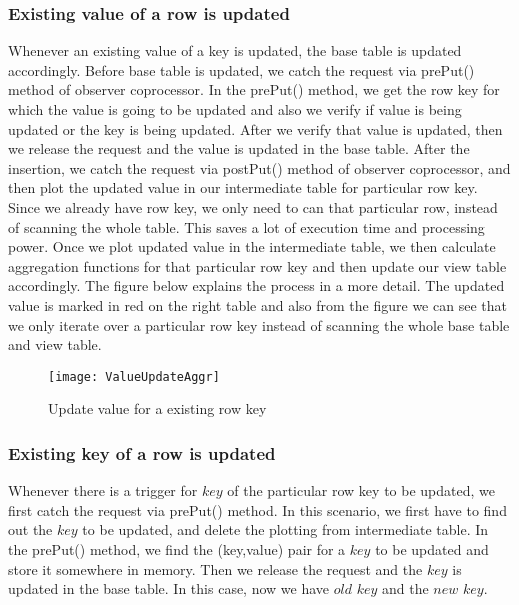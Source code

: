\documentclass[11pt,a4paper,bibtotoc,idxtotoc,headsepline,footsepline,footexclude,BCOR12mm,DIV13]{scrbook}
\begin{document}
\subsubsection{Existing value of a row is updated}
Whenever an existing value of a key is updated, the base table is updated accordingly. Before base table is updated, we catch the request via prePut() method of observer coprocessor. In the prePut() method, we get the row key for which the value is going to be updated and also we verify if value is being updated or the key is being updated. After we verify that value is updated, then we release the request and the value is updated in the base table. After the insertion, we catch the request via postPut() method of observer coprocessor, and then plot the updated value in our intermediate table for particular row key. Since we already have row key, we only need to can that particular row, instead of scanning the whole table. This saves a lot of execution time and processing power. Once we plot updated value in the intermediate table, we then calculate aggregation functions for that particular row key and then update our view table accordingly.
The figure below explains the process in a more detail. The updated value is marked in red on the right table and also from the figure we can see that we only iterate over a particular row key instead of scanning the whole base table and view table.

\begin{figure}
	\centering
	\texttt{[image: ValueUpdateAggr]}
	\caption{Update value for a existing row key}
	\label{sec:updatevalueforexistingkey}
	
\end{figure}  

\newpage
\subsubsection{Existing key of a row is updated}
\label{subsubsec:keyupdate}
Whenever there is a trigger for $key$ of the particular row key to be updated, we first catch the request via prePut() method. In this scenario, we first have to find out the $key$ to be updated, and delete the plotting from intermediate table. In the prePut() method, we find the (key,value) pair for a $key$ to be updated and store it somewhere in memory. Then we release the request and the $key$ is updated in the base table. In this case, now we have $old$ $key$ and the $new$ $key$. 
\end{document}
